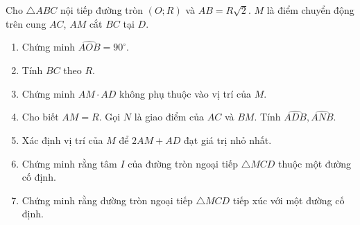 \begin{bt}%
	Cho $\triangle ABC$ nội tiếp đường tròn $(O;R)$ và $AB=R\sqrt{2}$. $M$ là điểm chuyển động trên cung $AC$, $AM$ cắt $BC$ tại $D$.
	\begin{enumerate}
		\item Chứng minh $\widehat{AOB}=90^\circ$.
		\item Tính $BC$ theo $R$.
		\item Chứng minh $AM\cdot AD$ không phụ thuộc vào vị trí của $M$.
		\item Cho biết $AM=R$. Gọi $N$ là giao điểm của $AC$ và $BM$. Tính $\widehat{ADB}, \widehat{ANB}$.
		\item Xác định vị trí của $M$ để $2AM+AD$ đạt giá trị nhỏ nhất.
		\item Chứng minh rằng tâm $I$ của đường tròn ngoại tiếp $\triangle MCD$ thuộc một đường cố định.
		\item Chứng minh rằng đường tròn ngoại tiếp $\triangle MCD$ tiếp xúc với một đường cố định.
	\end{enumerate}	 
\end{bt}
